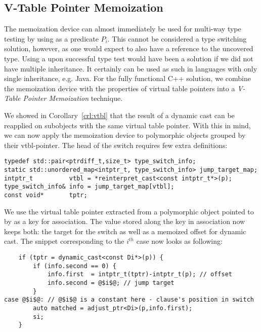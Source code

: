 \subsection{V-Table Pointer Memoization}
\label{sec:vtblmem}

The memoization device can almost immediately be used for multi-way type testing by 
using  as a predicate $P_i$. This cannot be considered a 
type switching solution, however, as one would expect to also have a reference 
to the uncovered type. Using a  upon successful type test 
would have been a solution if we did not have multiple inheritance. It certainly 
can be used as such in languages with only single inheritance, e.g.  
Java. For the fully functional C++ solution, we combine the memoization device with 
the properties of virtual table pointers into a \emph{V-Table Pointer 
Memoization} technique.

We showed in Corollary~\ref{crl:vtbl} that the result of a dynamic cast can be 
reapplied on subobjects with the same virtual table pointer. With this in mind, 
we can now apply the memoization device to polymorphic objects grouped by their 
vtbl-pointer. The head of the switch requires few extra definitions:

\begin{lstlisting}
typedef std::pair<ptrdiff_t,size_t> type_switch_info;
static std::unordered_map<intptr_t, type_switch_info> jump_target_map;
intptr_t          vtbl = *reinterpret_cast<const intptr_t*>(p);
type_switch_info& info = jump_target_map[vtbl];
const void*       tptr; 
\end{lstlisting}

\noindent
We use the virtual table pointer extracted from a polymorphic object pointed to 
by  as a key for association. The value stored along the key in 
association now keeps both: the target for the switch as well as a memoized 
offset for dynamic cast. The snippet corresponding to the $i^{th}$ case now 
looks as following:

\begin{lstlisting}
    if (tptr = dynamic_cast<const Di*>(p)) {
        if (info.second == 0) {
            info.first  = intptr_t(tptr)-intptr_t(p); // offset
            info.second = @$i$@; // jump target
        }
case @$i$@: // @$i$@ is a constant here - clause's position in switch
        auto matched = adjust_ptr<Di>(p,info.first); 
        si;
    }
\end{lstlisting}

